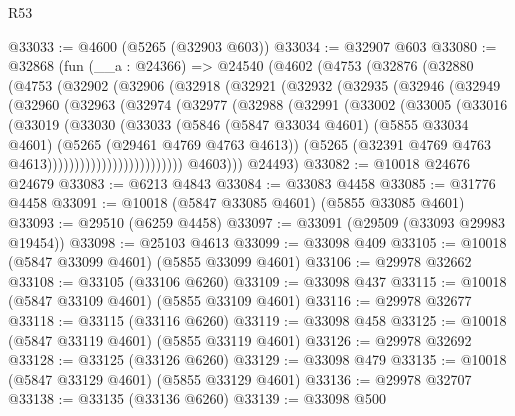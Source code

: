 \begin{lexlean}{R53}
\begin{coremodule}
@33033 := @4600 (@5265 (@32903 @603))
@33034 := @32907 @603
@33080 := @32868
    (fun (__a : @24366) =>
    @24540
      (@4602
        (@4753
          (@32876
            (@32880
              (@4753
                (@32902
                  (@32906
                    (@32918
                      (@32921
                        (@32932
                          (@32935
                            (@32946
                              (@32949
                                (@32960
                                  (@32963
                                    (@32974
                                      (@32977
                                        (@32988
                                          (@32991
                                            (@33002
                                              (@33005
                                                (@33016
                                                  (@33019
                                                    (@33030
                                                      (@33033
                                                        (@5846
                                                          (@5847 @33034 @4601)
                                                          (@5855 @33034 @4601)
                                                          (@5265 (@29461 @4769 @4763 @4613))
                                                          (@5265
                                                            (@32391
                                                              @4769
                                                              @4763
                                                              @4613)))))))))))))))))))))))))
            @4603)))
      @24493)
@33082 := @10018 @24676 @24679
@33083 := @6213 @4843
@33084 := @33083 @4458
@33085 := @31776 @4458
@33091 := @10018 (@5847 @33085 @4601) (@5855 @33085 @4601)
@33093 := @29510 (@6259 @4458)
@33097 := @33091 (@29509 (@33093 @29983 @19454))
@33098 := @25103 @4613
@33099 := @33098 @409
@33105 := @10018 (@5847 @33099 @4601) (@5855 @33099 @4601)
@33106 := @29978 @32662
@33108 := @33105 (@33106 @6260)
@33109 := @33098 @437
@33115 := @10018 (@5847 @33109 @4601) (@5855 @33109 @4601)
@33116 := @29978 @32677
@33118 := @33115 (@33116 @6260)
@33119 := @33098 @458
@33125 := @10018 (@5847 @33119 @4601) (@5855 @33119 @4601)
@33126 := @29978 @32692
@33128 := @33125 (@33126 @6260)
@33129 := @33098 @479
@33135 := @10018 (@5847 @33129 @4601) (@5855 @33129 @4601)
@33136 := @29978 @32707
@33138 := @33135 (@33136 @6260)
@33139 := @33098 @500

\end{coremodule}
\end{lexlean}
